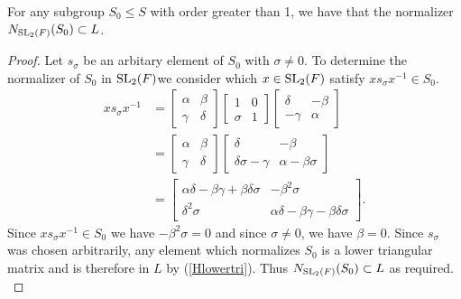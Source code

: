 \begin{proposition}
\label{normalizer_subgroup_S_le_L}
\leanok
 For any subgroup $S_0 \leq S$ with order greater than 1, we have that the normalizer $N_{\operatorname{SL}_2(F)}(S_0) \subset L$.
\end{proposition}
\begin{proof}
    \leanok
Let $s_\sigma$ be an arbitary element of $S_0$ with $\sigma \neq 0$. To determine the normalizer of $S_0$ in $\operatorname{SL}_2(F)$we consider which $x \in \operatorname{SL}_2(F)$ satisfy $x s_\sigma x^{-1} \in S_0$.
\begin{align*} x s_\sigma x^{-1} &= \begin{bmatrix} \alpha & \beta \\ \gamma & \delta \end{bmatrix} \begin{bmatrix} 1 & 0 \\ \sigma & 1 \end{bmatrix} \begin{bmatrix} \delta & - \beta \\ - \gamma & \alpha \end{bmatrix}
\\[1.5ex] &= \begin{bmatrix} \alpha & \beta \\ \gamma & \delta \end{bmatrix} \begin{bmatrix} \delta & - \beta \\ \delta \sigma - \gamma & \alpha - \beta \sigma \end{bmatrix}
\\[1.5ex] &= \begin{bmatrix} \alpha \delta - \beta \gamma + \beta \delta \sigma & - \beta^2  \sigma \\ \delta^2 \sigma & \alpha \delta - \beta \gamma - \beta \delta \sigma \end{bmatrix}.
\end{align*}
Since $x s_\sigma x^{-1} \in S_0$ we have $- \beta^2  \sigma = 0$ and since $\sigma \neq 0$, we have $\beta = 0$. Since $s_\sigma$ was chosen arbitrarily, 
any element which normalizes $S_0$ is a lower triangular matrix and is therefore in $L$ by (\ref{Hlowertri}). Thus $N_{\operatorname{SL}_2(F)}(S_0) \subset L$ as required. \\
\end{proof}
